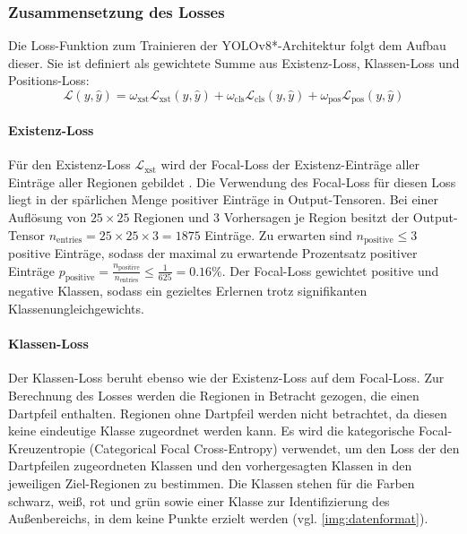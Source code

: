 \subsubsection{Zusammensetzung des Losses}

Die Loss-Funktion zum Trainieren der YOLOv8*-Architektur folgt dem Aufbau dieser. Sie ist definiert als gewichtete Summe aus Existenz-Loss, Klassen-Loss und Positions-Loss:
\[ \mathcal{L}(y, \hat{y}) = \omega_\text{xst} \mathcal{L}_\text{xst}(y, \hat{y}) + \omega_\text{cls} \mathcal{L}_\text{cls}(y, \hat{y}) + \omega_\text{pos} \mathcal{L}_\text{pos}(y, \hat{y}) \]
\paragraph{Existenz-Loss}

Für den Existenz-Loss $\mathcal{L}_\text{xst}$ wird der Focal-Loss der Existenz-Einträge aller Einträge aller Regionen gebildet \cite{focal_loss}. Die Verwendung des Focal-Loss für diesen Loss liegt in der spärlichen Menge positiver Einträge in Output-Tensoren. Bei einer Auflösung von $25 \times 25$ Regionen und 3 Vorhersagen je Region besitzt der Output-Tensor $n_\text{entries} = 25 \times 25 \times 3 = 1875$ Einträge. Zu erwarten sind $ n_\text{positive} \leq 3 $ positive Einträge, sodass der maximal zu erwartende Prozentsatz positiver Einträge $p_\text{positive} = \frac{n_\text{positive}}{n_\text{entries}} \leq \frac{1}{625} = 0.16\% $. Der Focal-Loss gewichtet positive und negative Klassen, sodass ein gezieltes Erlernen trotz signifikanten Klassenungleichgewichts.

\paragraph{Klassen-Loss}

Der Klassen-Loss beruht ebenso wie der Existenz-Loss auf dem Focal-Loss. Zur Berechnung des Losses werden die Regionen in Betracht gezogen, die einen Dartpfeil enthalten. Regionen ohne Dartpfeil werden nicht betrachtet, da diesen keine eindeutige Klasse zugeordnet werden kann. Es wird die kategorische Focal-Kreuzentropie (Categorical Focal Cross-Entropy) \cite{focal_loss} verwendet, um den Loss der den Dartpfeilen zugeordneten Klassen und den vorhergesagten Klassen in den jeweiligen Ziel-Regionen zu bestimmen. Die Klassen stehen für die Farben schwarz, weiß, rot und grün sowie einer Klasse zur Identifizierung des Außenbereichs, in dem keine Punkte erzielt werden (vgl. \autoref{img:datenformat}).

